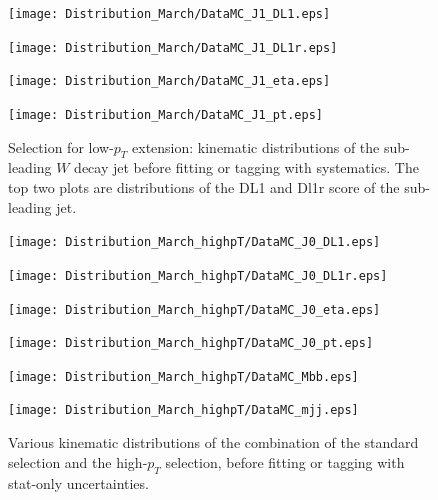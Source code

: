 \documentclass[letterpaper,12pt]{article}
\begin{document}
\begin{figure}[H]
\begin{minipage}[b]{.45\textwidth}
\centering
\texttt{[image: Distribution\_March/DataMC\_J1\_DL1.eps]}
\end{minipage}\hfill
\begin{minipage}[b]{.45\textwidth}
\centering
\texttt{[image: Distribution\_March/DataMC\_J1\_DL1r.eps]}
\end{minipage}\hfill
\begin{minipage}[b]{.45\textwidth}
\centering
\texttt{[image: Distribution\_March/DataMC\_J1\_eta.eps]}
\end{minipage}\hfill
\begin{minipage}[b]{.45\textwidth}
\centering
\texttt{[image: Distribution\_March/DataMC\_J1\_pt.eps]}
\end{minipage}
\caption{Selection for low-$p_T$ extension: kinematic distributions of the 
sub-leading $W$ decay jet before fitting or tagging with systematics. 
The top two plots are distributions of the DL1 and Dl1r score of the 
sub-leading jet.} \label{fig:lowpT_selection}
\end{figure}


\begin{figure}[H]
\begin{minipage}[b]{.45\textwidth}
\centering
\texttt{[image: Distribution\_March\_highpT/DataMC\_J0\_DL1.eps]}
\end{minipage}\hfill
\begin{minipage}[b]{.45\textwidth}
\centering
\texttt{[image: Distribution\_March\_highpT/DataMC\_J0\_DL1r.eps]}
\end{minipage}\hfill
\begin{minipage}[b]{.45\textwidth}
\centering
\texttt{[image: Distribution\_March\_highpT/DataMC\_J0\_eta.eps]}
\end{minipage}\hfill
\begin{minipage}[b]{.45\textwidth}
\centering
\texttt{[image: Distribution\_March\_highpT/DataMC\_J0\_pt.eps]}
\end{minipage}\hfill
\begin{minipage}[b]{.45\textwidth}
\centering
\texttt{[image: Distribution\_March\_highpT/DataMC\_Mbb.eps]}
\end{minipage}\hfill
\begin{minipage}[b]{.45\textwidth}
\centering
\texttt{[image: Distribution\_March\_highpT/DataMC\_mjj.eps]}
\end{minipage}
\caption{Various kinematic distributions of the combination of the 
standard selection and the high-$p_T$ selection, before fitting or 
tagging with stat-only uncertainties.} \label{fig:highpT_selection}
\end{figure}
\end{document}
